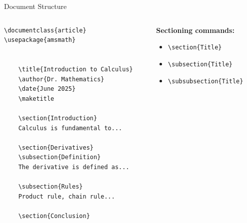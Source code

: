\begin{frame}[fragile]{Document Structure}
    \begin{columns}
        \begin{column}{0.5\textwidth}
            \begin{lstlisting}
\documentclass{article}
\usepackage{amsmath}


    \title{Introduction to Calculus}
    \author{Dr. Mathematics}
    \date{June 2025}
    \maketitle
    
    \section{Introduction}
    Calculus is fundamental to...
    
    \section{Derivatives}
    \subsection{Definition}
    The derivative is defined as...
    
    \subsection{Rules}
    Product rule, chain rule...
    
    \section{Conclusion}

            \end{lstlisting}
        \end{column}
        
        \begin{column}{0.5\textwidth}
            \textbf{Sectioning commands:}
            \begin{itemize}
                \item \texttt{\textbackslash section\{Title\}}
                \item \texttt{\textbackslash subsection\{Title\}}
                \item \texttt{\textbackslash subsubsection\{Title\}}
            \end{itemize}
            

\end{column}
\end{columns}
\end{frame}
